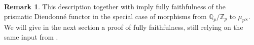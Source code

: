 \documentclass{amsart}
\newcommand{\prism}{{\mathlarger{\mathbbl{\Delta}}}}
\theoremstyle{plain}
\newtheorem{theorem}{Theorem}[subsection]
\theoremstyle{definition}
\newtheorem{remark}[theorem]{Remark}
\newcommand{\Q}{\mathbb{Q}}
\newcommand{\tilxi}{\tilde{\xi}}
\newcommand{\Z}{\mathbb{Z}}
\newcommand{\blue}[1]{{\color{black}#1}}
\begin{document}
\begin{remark}
\label{sec:prism-dieud-modul-theorem-fully-faithfulness-for-morphisms-from-qp-tomu-p}
This description together with \cite[Theorem 7.5.6]{bhatt2022absolute} imply fully faithfulness of the prismatic Dieudonn\'e functor in the special case of morphisms from $\Q_p/\Z_p$ to $\mu_{p^{\infty}}$. We will give in the next section a proof of fully faithfulness, still relying on the same input from \cite{bhatt2022absolute}.
\end{remark}


%
%
%  
\end{document}
